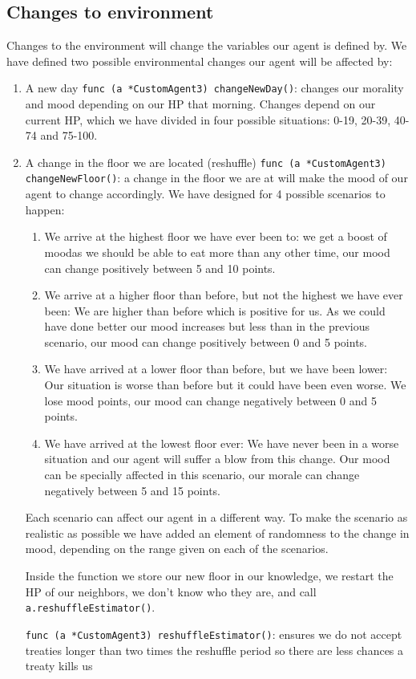 \subsection{Changes to environment}
Changes to the environment will change the variables our agent is defined by. We have defined two possible environmental changes our agent will be affected by:
\begin{enumerate}
    \item A new day \texttt{func (a *CustomAgent3) changeNewDay()}: changes our morality and mood depending on our HP that morning. Changes depend on our current HP, which we have divided in four possible situations: 0-19, 20-39, 40-74 and 75-100.
    \item A change in the floor we are located (reshuffle) \texttt{func (a *CustomAgent3) changeNewFloor()}: a change in the floor we are at will make the mood of our agent to change accordingly. We have designed for 4 possible scenarios to happen: 
    \begin{enumerate}
        \item We arrive at the highest floor we have ever been to: we get a boost of moodas we should be able to eat more than any other time, our mood can change positively between 5 and 10 points.
        \item We arrive at a higher floor than before, but not the highest we have ever been: We are higher than before which is positive for us. As we could have done better our mood increases but less than in the previous scenario, our mood can change positively between 0 and 5 points.
        \item We have arrived at a lower floor than before, but we have been lower: Our situation is worse than before but it could have been even worse. We lose mood points, our mood can change negatively between 0 and 5 points.
        \item We have arrived at the lowest floor ever: We have never been in a worse situation and our agent will suffer a blow from this change. Our mood can be specially affected in this scenario, our morale can change negatively between 5 and 15 points.
    \end{enumerate}
    Each scenario can affect our agent in a different way. To make the scenario as realistic as possible we have added an element of randomness to the change in mood, depending on the range given on each of the scenarios. \par
    Inside the function we store our new floor in our knowledge, we restart the HP of our neighbors, we don’t know who they are, and call \texttt{a.reshuffleEstimator()}. \par
    \texttt{func (a *CustomAgent3) reshuffleEstimator()}: ensures we do not accept treaties longer than two times the reshuffle period so there are less chances a treaty kills us 
\end{enumerate}

